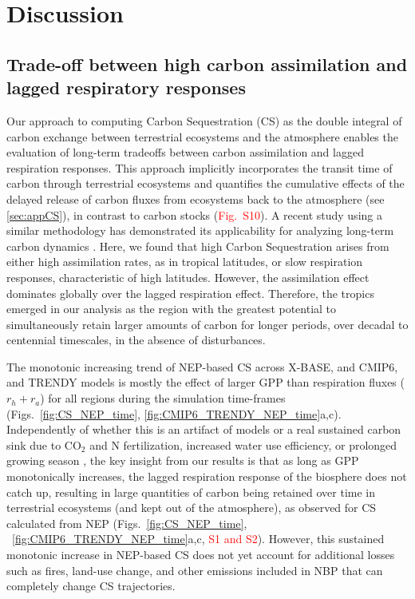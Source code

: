 \documentclass[ProofPDF]{./Styles/Jnls-Template-V3}
\begin{document}
\section{Discussion}
\subsection{Trade-off between high carbon assimilation and lagged respiratory responses}
Our approach to computing Carbon Sequestration (CS) as the double integral of carbon exchange between terrestrial ecosystems and the atmosphere enables the evaluation of long-term tradeoffs between carbon assimilation and lagged respiration responses. This approach implicitly incorporates the transit time of carbon through terrestrial ecosystems and quantifies the cumulative effects of the delayed release of carbon fluxes from ecosystems back to the atmosphere (see \ref{sec:appCS}), in contrast to carbon stocks (\textcolor{red}{Fig.~S10}). A recent study using a similar methodology has demonstrated its applicability for analyzing long-term carbon dynamics \citep{Matthews2023}. Here, we found that high Carbon Sequestration arises from either high assimilation rates, as in tropical latitudes, or slow respiration responses, characteristic of high latitudes. However, the assimilation effect dominates globally over the lagged respiration effect. Therefore, the tropics emerged in our analysis as the region with the greatest potential to simultaneously retain larger amounts of carbon for longer periods, over decadal to centennial timescales, in the absence of disturbances. 


The monotonic increasing trend of NEP-based CS across X-BASE, and CMIP6, and TRENDY models is mostly the effect of larger GPP than respiration fluxes ($r_h+r_a$) for all regions during the simulation time-frames (Figs.~\ref{fig:CS_NEP_time}, \ref{fig:CMIP6_TRENDY_NEP_time}a,c). Independently of whether this is an artifact of models or a real sustained carbon sink due to CO$_2$ and N fertilization, increased water use efficiency, or prolonged growing season \citep{Fernandez-Martinez2017,Fernandez-Martinez2019,OSullivan2019,Friedlingstein2023,Ruehr2023}, the key insight from our results is that as long as GPP monotonically increases, the lagged respiration response of the biosphere does not catch up, resulting in large quantities of carbon being retained over time in terrestrial ecosystems (and kept out of the atmosphere), as observed for CS calculated from NEP (Figs.~\ref{fig:CS_NEP_time}, ~\ref{fig:CMIP6_TRENDY_NEP_time}a,c, \textcolor{red}{S1 and S2}). However, this sustained monotonic increase in NEP-based CS does not yet account for additional losses such as fires, land-use change, and other emissions included in NBP that can completely change CS trajectories.
\end{document}
